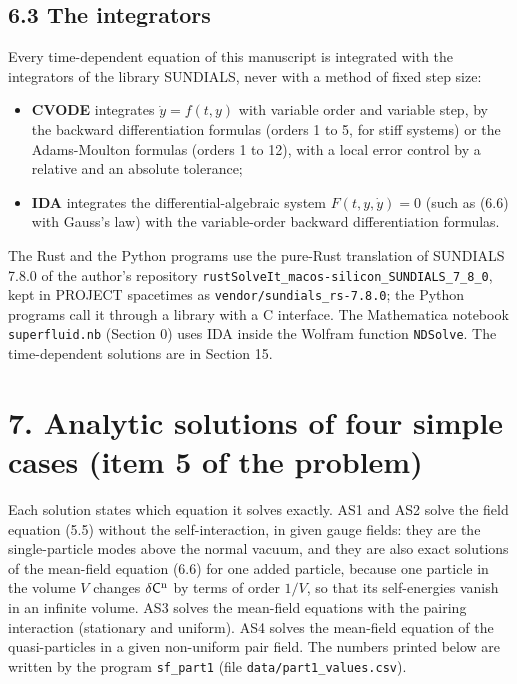 \documentclass[
  10pt,
]{article}
\providecommand{\tightlist}{%
  \setlength{\itemsep}{0pt}\setlength{\parskip}{0pt}}
\begin{document}
\hypertarget{the-integrators}{%
\subsection{6.3 The integrators}\label{the-integrators}}

Every time-dependent equation of this manuscript is integrated with the
integrators of the library SUNDIALS, never with a method of fixed step
size:

\begin{itemize}
\tightlist
\item
  \textbf{CVODE} integrates \(\dot y=f(t,y)\) with variable order and
  variable step, by the backward differentiation formulas (orders 1 to
  5, for stiff systems) or the Adams-Moulton formulas (orders 1 to 12),
  with a local error control by a relative and an absolute tolerance;
\item
  \textbf{IDA} integrates the differential-algebraic system
  \(F(t,y,\dot y)=0\) (such as (6.6) with Gauss's law) with the
  variable-order backward differentiation formulas.
\end{itemize}

The Rust and the Python programs use the pure-Rust translation of
SUNDIALS 7.8.0 of the author's repository
\texttt{rustSolveIt\_macos-silicon\_SUNDIALS\_7\_8\_0}, kept in PROJECT
spacetimes as \texttt{vendor/sundials\_rs-7.8.0}; the Python programs
call it through a library with a C interface. The Mathematica notebook
\texttt{superfluid.nb} (Section 0) uses IDA inside the Wolfram function
\texttt{NDSolve}. The time-dependent solutions are in Section 15.

\hypertarget{analytic-solutions-of-four-simple-cases-item-5-of-the-problem}{%
\section{7. Analytic solutions of four simple cases (item 5 of the
problem)}\label{analytic-solutions-of-four-simple-cases-item-5-of-the-problem}}

Each solution states which equation it solves exactly. AS1 and AS2 solve
the field equation (5.5) without the self-interaction, in given gauge
fields: they are the single-particle modes above the normal vacuum, and
they are also exact solutions of the mean-field equation (6.6) for one
added particle, because one particle in the volume \(V\) changes
\(\delta\mathsf C^{\rm n}\) by terms of order \(1/V\), so that its
self-energies vanish in an infinite volume. AS3 solves the mean-field
equations with the pairing interaction (stationary and uniform). AS4
solves the mean-field equation of the quasi-particles in a given
non-uniform pair field. The numbers printed below are written by the
program \texttt{sf\_part1} (file \texttt{data/part1\_values.csv}).
\end{document}
